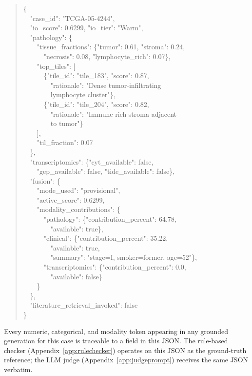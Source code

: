 \documentclass{article}
\theoremstyle{plain}
\begin{document}
\begin{quote}\footnotesize\ttfamily
\{\\
~~"case\_id": "TCGA-05-4244",\\
~~"io\_score": 0.6299, "io\_tier": "Warm",\\
~~"pathology": \{\\
~~~~"tissue\_fractions": \{"tumor": 0.61, "stroma": 0.24,\\
~~~~~~"necrosis": 0.08, "lymphocyte\_rich": 0.07\},\\
~~~~"top\_tiles": [\\
~~~~~~\{"tile\_id": "tile\_183", "score": 0.87,\\
~~~~~~~~"rationale": "Dense tumor-infiltrating\\
~~~~~~~~lymphocyte cluster"\},\\
~~~~~~\{"tile\_id": "tile\_204", "score": 0.82,\\
~~~~~~~~"rationale": "Immune-rich stroma adjacent\\
~~~~~~~~to tumor"\}\\
~~~~],\\
~~~~"til\_fraction": 0.07\\
~~\},\\
~~"transcriptomics": \{"cyt\_available": false,\\
~~~~"gep\_available": false, "tide\_available": false\},\\
~~"fusion": \{\\
~~~~"mode\_used": "provisional",\\
~~~~"active\_score": 0.6299,\\
~~~~"modality\_contributions": \{\\
~~~~~~"pathology": \{"contribution\_percent": 64.78,\\
~~~~~~~~"available": true\},\\
~~~~~~"clinical": \{"contribution\_percent": 35.22,\\
~~~~~~~~"available": true,\\
~~~~~~~~"summary": "stage=I, smoker=former, age=52"\},\\
~~~~~~"transcriptomics": \{"contribution\_percent": 0.0,\\
~~~~~~~~"available": false\}\\
~~~~\}\\
~~\},\\
~~"literature\_retrieval\_invoked": false\\
\}
\end{quote}

Every numeric, categorical, and modality token appearing in any grounded generation for this case is traceable to a field in this JSON. The rule-based checker (Appendix~\ref{app:rulechecker}) operates on this JSON as the ground-truth reference; the LLM judge (Appendix~\ref{app:judgeprompt}) receives the same JSON verbatim.
\end{document}
